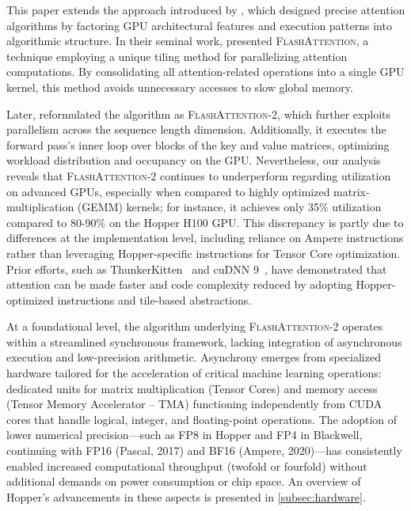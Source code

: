 This paper extends the approach introduced by \citet{dao2022flashattention}, which designed precise attention algorithms by factoring GPU architectural features and execution patterns into algorithmic structure. In their seminal work, \citep{dao2022flashattention} presented \textsc{FlashAttention}, a technique employing a unique tiling method for parallelizing attention computations. By consolidating all attention-related operations into a single GPU kernel, this method avoids unnecessary accesses to slow global memory.

Later, \citet{dao2023flashattention2} reformulated the algorithm as \textsc{FlashAttention-2}, which further exploits parallelism across the sequence length dimension. Additionally, it executes the forward pass’s inner loop over blocks of the key and value matrices, optimizing workload distribution and occupancy on the GPU. Nevertheless, our analysis reveals that \textsc{FlashAttention-2} continues to underperform regarding utilization on advanced GPUs, especially when compared to highly optimized matrix-multiplication (GEMM) kernels; for instance, it achieves only 35\% utilization compared to 80-90\% on the Hopper H100 GPU. This discrepancy is partly due to differences at the implementation level, including reliance on Ampere instructions rather than leveraging Hopper-specific instructions for Tensor Core optimization. Prior efforts, such as ThunkerKitten~\citep{spector2024thunder} and cuDNN 9~\citep{cudnn9}, have demonstrated that attention can be made faster and code complexity reduced by adopting Hopper-optimized instructions and tile-based abstractions.

At a foundational level, the algorithm underlying \textsc{FlashAttention-2} operates within a streamlined synchronous framework, lacking integration of asynchronous execution and low-precision arithmetic. Asynchrony emerges from specialized hardware tailored for the acceleration of critical machine learning operations: dedicated units for matrix multiplication (Tensor Cores) and memory access (Tensor Memory Accelerator -- TMA) functioning independently from CUDA cores that handle logical, integer, and floating-point operations. The adoption of lower numerical precision—such as FP8 in Hopper and FP4 in Blackwell, continuing with FP16 (Pascal, 2017) and BF16 (Ampere, 2020)—has consistently enabled increased computational throughput (twofold or fourfold) without additional demands on power consumption or chip space. An overview of Hopper's advancements in these aspects is presented in \cref{subsec:hardware}. 

